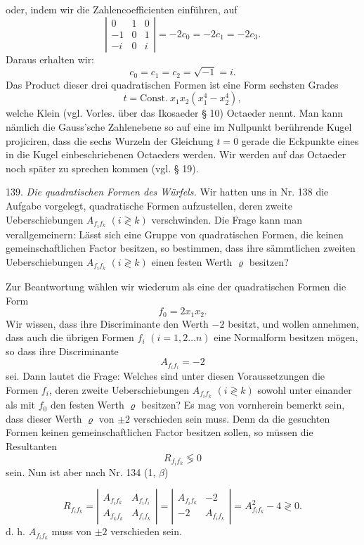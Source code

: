 oder, indem wir die Zahlencoefficienten einführen, auf
\[
\left|\begin{array}{ccc} 0 & 1 & 0 \\ -1 & 0 & 1 \\ -i & 0 & i \end{array}\right| = -2c_0 = -2c_1 = -2c_3. %
\]
Daraus erhalten wir:
\[
c_0 = c_1 = c_2 = \sqrt{-1} = i.
\]
Das Product dieser drei quadratischen Formen ist eine Form sechsten
Grades
\[
t = \mathrm{Const.}\ x_1x_2(x_1^4 - x_2^4),
\]
welche Klein (vgl. Vorles. über das Ikosaeder § 10) Octaeder nennt.
Man kann nämlich die Gauss'sche Zahlenebene so auf eine im Nullpunkt
berührende Kugel projiciren, dass die sechs Wurzeln der Gleichung
$t = 0$ gerade die Eckpunkte eines in die Kugel einbeschriebenen
Octaeders werden. Wir werden auf das Octaeder noch später zu
sprechen kommen (vgl. § 19).

139. \textit{Die quadratischen Formen des Würfels.} Wir hatten uns in
Nr. 138 die Aufgabe vorgelegt, quadratische Formen aufzustellen,
deren zweite Ueberschiebungen $A_{f_if_k}$ $(i \gtrless k)$ verschwinden. Die Frage
kann man verallgemeinern: Lässt sich eine Gruppe von quadratischen
Formen, die keinen gemeinschaftlichen Factor besitzen, so bestimmen,
dass ihre sämmtlichen zweiten Ueberschiebungen $A_{f_if_k}$ $(i \gtrless k)$ einen
festen Werth $\varrho$ besitzen?

Zur Beantwortung wählen wir wiederum als eine der quadratischen
 Formen die Form
\[
f_0 = 2x_1x_2.
\]
Wir wissen, dass ihre Discriminante den Werth $-2$ besitzt, und wollen
annehmen, dass auch die übrigen Formen $f_i$ $(i = 1, 2 \dots n)$ eine
Normalform besitzen mögen, so dass ihre Discriminante
\[
A_{f_if_i} = -2
\]
sei. Dann lautet die Frage: Welches sind unter diesen Voraussetzungen
 die Formen $f_i$, deren zweite Ueberschiebungen $A_{f_if_k}$ $(i \gtrless k)$
sowohl unter einander als mit $f_0$ den festen Werth $\varrho$ besitzen? Es
mag von vornherein bemerkt sein, dass dieser Werth $\varrho$ von $\pm 2$ verschieden
 sein muss. Denn da die gesuchten Formen keinen gemeinschaftlichen
 Factor besitzen sollen, so müssen die Resultanten
\[
R_{f_if_k} \lessgtr 0
\]
sein. Nun ist aber nach Nr. 134 (1, $\beta$)


\[
R_{f_if_k} = \left|\begin{array}{cc} A_{f_if_k} & A_{f_if_i} \\ A_{f_kf_k} & A_{f_if_k} \end{array}\right| = \left|\begin{array}{cc} A_{f_if_k} & -2 \\ -2 & A_{f_if_k} \end{array}\right| = A_{f_if_k}^2 - 4 \gtrless 0.
\]
d. h. $A_{f_if_k}$ muss von $\pm 2$ verschieden sein.

